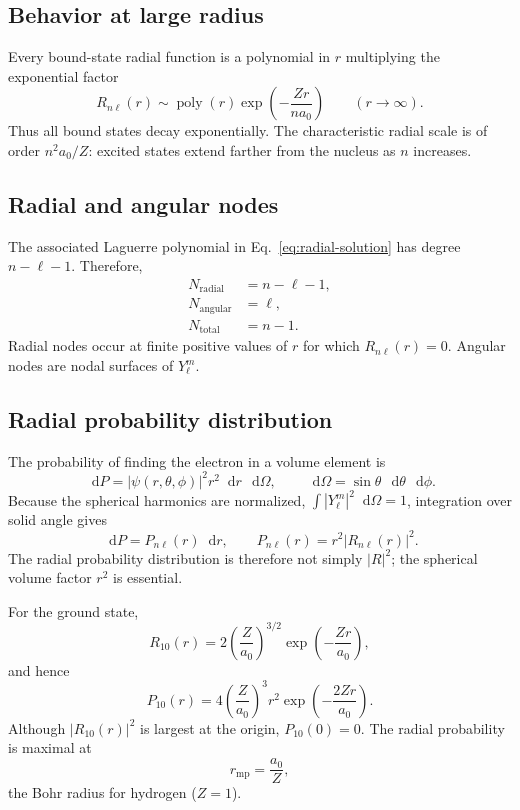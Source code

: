 \documentclass[11pt]{article}
\newcommand{\dd}{\mathop{}\!\mathrm{d}}
\newcommand{\abs}[1]{\left\lvert #1\right\rvert}
\begin{document}
\subsection{Behavior at large radius}

Every bound-state radial function is a polynomial in $r$ multiplying the
exponential factor
\begin{equation}
  R_{n\ell}(r)\sim \operatorname{poly}(r)
  \exp\left(-\frac{Zr}{na_0}\right)
  \qquad (r\to\infty).
\end{equation}
Thus all bound states decay exponentially.  The characteristic radial scale is
of order $n^2a_0/Z$: excited states extend farther from the nucleus as $n$
increases.

\subsection{Radial and angular nodes}

The associated Laguerre polynomial in Eq.~\eqref{eq:radial-solution} has degree
$n-\ell-1$.  Therefore,
\begin{align}
  N_{\text{radial}}&=n-\ell-1,\\
  N_{\text{angular}}&=\ell,\\
  N_{\text{total}}&=n-1.
\end{align}
Radial nodes occur at finite positive values of $r$ for which $R_{n\ell}(r)=0$.
Angular nodes are nodal surfaces of $Y_{\ell}^{m}$.

\subsection{Radial probability distribution}

The probability of finding the electron in a volume element is
\begin{equation}
  \dd P=\abs{\psi(r,\theta,\phi)}^2 r^2\dd r\,\dd\Omega,
  \qquad
  \dd\Omega=\sin\theta\,\dd\theta\,\dd\phi.
\end{equation}
Because the spherical harmonics are normalized,
$\int\abs{Y_{\ell}^{m}}^2\dd\Omega=1$, integration over solid angle gives
\begin{equation}
  \dd P=P_{n\ell}(r)\dd r,
  \qquad
  \boxed{P_{n\ell}(r)=r^2\abs{R_{n\ell}(r)}^2}.
\end{equation}
The radial probability distribution is therefore not simply $\abs{R}^2$; the
spherical volume factor $r^2$ is essential.

For the ground state,
\begin{equation}
  R_{10}(r)=2\left(\frac{Z}{a_0}\right)^{3/2}
  \exp\left(-\frac{Zr}{a_0}\right),
\end{equation}
and hence
\begin{equation}
  P_{10}(r)=4\left(\frac{Z}{a_0}\right)^3r^2
  \exp\left(-\frac{2Zr}{a_0}\right).
\end{equation}
Although $\abs{R_{10}(r)}^2$ is largest at the origin, $P_{10}(0)=0$.  The radial
probability is maximal at
\begin{equation}
  \boxed{r_{\mathrm{mp}}=\frac{a_0}{Z}},
\end{equation}
the Bohr radius for hydrogen ($Z=1$).
\end{document}
